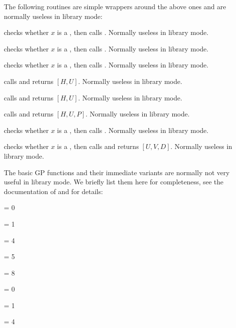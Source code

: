 The following routines are simple wrappers around the above ones and are
normally useless in library mode:

 checks whether $x$ is a , then calls .
Normally useless in library mode.

 checks whether $x$ is a , then calls
. Normally useless in library mode.

 checks whether $x$ is a , then calls
. Normally useless in library mode.

 calls
 and returns $[H, U]$. Normally useless in library
mode.

 calls  and returns $[H,
U]$. Normally useless in library mode.

 calls  and returns $[H, U,
P]$. Normally useless in library mode.

 checks whether $x$ is a , then calls
. Normally useless in library mode.

 checks whether $x$ is a , then calls
 and returns $[U,V,D]$. Normally useless in
library mode.


The basic GP functions and their immediate variants are normally not very
useful in library mode. We briefly list them here for completeness, see the
documentation of  and  for details:

\item {}

 \fl = 0

 \fl = 1

 \fl = 4

 \fl = 5

 \fl = 8

\item {}

 \fl = 0

 \fl = 1

 \fl = 4

